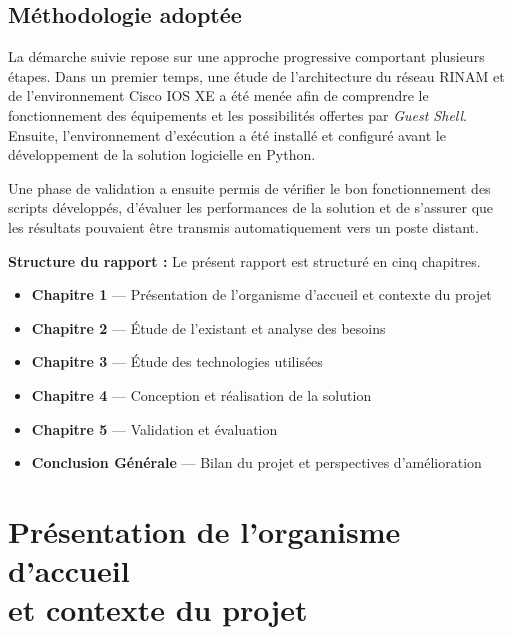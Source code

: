 \documentclass[12pt, a4paper, oneside]{report}
\begin{document}
\section*{Méthodologie adoptée}

La démarche suivie repose sur une approche progressive comportant plusieurs étapes. 
Dans un premier temps, une étude de l'architecture du réseau \ac{RINAM} et de l'environnement 
Cisco IOS XE a été menée afin de comprendre le fonctionnement des équipements et 
les possibilités offertes par \textit{Guest Shell}. Ensuite, l'environnement d'exécution 
a été installé et configuré avant le développement de la solution logicielle en Python.

Une phase de validation a ensuite permis de vérifier le bon fonctionnement des 
scripts développés, d'évaluer les performances de la solution et de s'assurer que 
les résultats pouvaient être transmis automatiquement vers un poste distant.


\textbf{Structure du rapport :}
Le présent rapport est structuré en cinq chapitres.

\begin{itemize}[label=\textcolor{primary}{}]
  \item \textbf{Chapitre 1} — Présentation de l'organisme d'accueil et contexte du projet
  \item \textbf{Chapitre 2} — Étude de l'existant et analyse des besoins
  \item \textbf{Chapitre 3} — Étude des technologies utilisées
  \item \textbf{Chapitre 4} — Conception et réalisation de la solution
  \item \textbf{Chapitre 5} — Validation et évaluation
  \item \textbf{Conclusion Générale} — Bilan du projet et perspectives d'amélioration
\end{itemize}

\chapter{Présentation de l’organisme d’accueil \\et contexte du projet}
\end{document}
